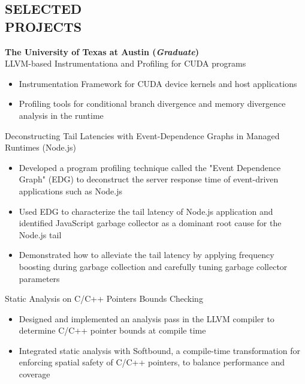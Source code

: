 \documentclass[margin, 9pt]{res} %
\begin{document}
\begin{resume}
\section{SELECTED\\ PROJECTS}

{\large\textbf{The University of Texas at Austin (\textit{Graduate})}}\\

\vspace*{-7pt}
 LLVM-based Instrumentationa and Profiling for CUDA programs\\
\vspace*{-10pt}
\begin{itemize}[leftmargin=*] \itemsep -3pt
\vspace*{-5pt}
	\item Instrumentation Framework for CUDA device kernels and host applications
  \item Profiling tools for conditional branch divergence and memory divergence analysis in the runtime
\end{itemize}

\medskip
\vspace*{-7pt}
Deconstructing Tail Latencies with Event-Dependence Graphs in Managed Runtimes (Node.js)\\
\vspace*{-10pt}
\begin{itemize}[leftmargin=*] \itemsep -3pt
\vspace*{-5pt}
	\item Developed a program profiling technique called the "Event Dependence Graph" (EDG) to deconstruct the server response time of event-driven applications such as Node.js
	\item Used EDG to characterize the tail latency of Node.js application and identified JavaScript garbage collector as a dominant root cause for the Node.js tail
	\item Demonstrated how to alleviate the tail latency by applying frequency boosting during garbage collection and carefully tuning garbage collector parameters
\end{itemize}

\medskip
Static Analysis on C/C++ Pointers Bounds Checking\\
\vspace*{-10pt}
\begin{itemize}[leftmargin=*] \itemsep -3pt
\vspace*{-5pt}
	\item Designed and implemented an analysis pass in the LLVM compiler to determine C/C++ pointer bounds at compile time
	\item Integrated static analysis with Softbound, a compile-time transformation for enforcing spatial safety of C/C++ pointers, to balance performance and coverage
\end{itemize}


\end{resume}
\end{document}
